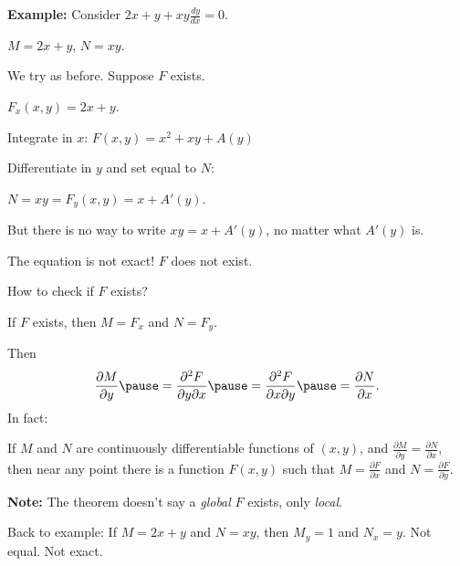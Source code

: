 \documentclass[10pt,aspectratio=169]{beamer}
\begin{document}
\begin{frame}

\textbf{Example:}
Consider \quad $2x+y + xy \frac{dy}{dx} = 0$.

\medskip
\pause

$M = 2x+y$, \quad $N=xy$.

\medskip
\pause

We try as before.  Suppose $F$ exists.

\medskip
\pause

$F_x (x,y) = 2x+y$.

\medskip
\pause

Integrate in $x$: \quad $F(x,y) = x^2 + xy + A(y)$

\medskip
\pause

Differentiate in $y$ and set equal to $N$:

\medskip
\pause

$N = xy = F_y (x,y) = x+A'(y)$.

\medskip
\pause

But there is no way to write $xy = x+ A'(y)$, no matter what $A'(y)$ is.

\medskip
\pause

The equation is not exact!  $F$ does not exist.
\end{frame}

\begin{frame}
How to check if $F$ exists?

\medskip
\pause

If $F$ exists, then
$M = F_x$ and
$N = F_y$.

\medskip
\pause

Then
\[
\frac{\partial M}{\partial y}
\pause
=
\frac{\partial^2 F}{\partial y \partial x}
\pause
=
\frac{\partial^2 F}{\partial x \partial y}
\pause
=
\frac{\partial N}{\partial x} .
\]
\pause
In fact:

\begin{theorem}[Poincar\'e]
If $M$ and $N$ are continuously differentiable functions of $(x,y)$, and
$\frac{\partial M}{\partial y} = \frac{\partial N}{\partial x}$,
then near any point there is a function $F(x,y)$
such that
$M = \frac{\partial F}{\partial x}$ and
$N = \frac{\partial F}{\partial y}$.
\end{theorem}

\pause

\textbf{Note:} The theorem doesn't say a \emph{global} $F$ exists, only \emph{local}.

\medskip
\pause

Back to example: If $M = 2x + y$ and $N = xy$,  
then
$M_y = 1$ and  $N_x = y$.
\pause
Not equal.
\pause
Not exact.

\end{frame}
\end{document}
